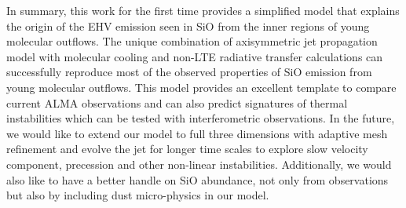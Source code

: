 \documentclass[useAMS,usenatbib]{mn2e}
\begin{document}
In summary, this work for the first time provides a simplified model
that explains the origin of the EHV emission seen in SiO from 
the inner regions of young molecular outflows. The unique combination
of axisymmetric jet propagation model with molecular cooling and
non-LTE radiative transfer calculations can successfully reproduce most
of the observed properties of SiO emission from young molecular
outflows. This model provides an excellent
template to compare current ALMA observations and can also predict
signatures of thermal instabilities which can be tested with
interferometric observations. In the future, we would like to extend our
model to full three dimensions with adaptive mesh refinement
and evolve the jet for longer time scales to explore slow velocity 
component, precession and other non-linear instabilities. Additionally, we would also like to have
a better handle on SiO abundance, not only from observations but also
by including dust micro-physics in our model. 




\appendix
\end{document}

